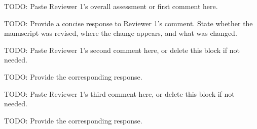 \reviewer

\begin{revcomment}
TODO: Paste Reviewer 1's overall assessment or first comment here.
\end{revcomment}
\begin{revresponse}
TODO: Provide a concise response to Reviewer 1's comment. State whether the manuscript was revised, where the change appears, and what was changed.
\end{revresponse}

\begin{revcomment}
TODO: Paste Reviewer 1's second comment here, or delete this block if not needed.
\end{revcomment}
\begin{revresponse}
TODO: Provide the corresponding response.
\end{revresponse}

\begin{revcomment}
TODO: Paste Reviewer 1's third comment here, or delete this block if not needed.
\end{revcomment}
\begin{revresponse}
TODO: Provide the corresponding response.
\end{revresponse}

